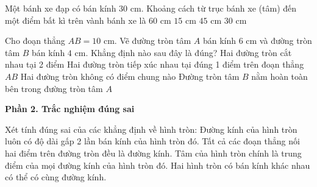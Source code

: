 \begin{ex} %
Một bánh xe đạp có bán kính $30\text{ cm}$. Khoảng cách từ trục bánh xe (tâm) đến một điểm bất kì trên vành bánh xe là
\choice
{$60\text{ cm}$}
{$15\text{ cm}$}
{$45\text{ cm}$}
{\True $30\text{ cm}$}
\end{ex}

\begin{ex} %
Cho đoạn thẳng $AB = 10\text{ cm}$. Vẽ đường tròn tâm $A$ bán kính $6\text{ cm}$ và đường tròn tâm $B$ bán kính $4\text{ cm}$. Khẳng định nào sau đây là đúng?
\choice
{Hai đường tròn cắt nhau tại 2 điểm}
{\True Hai đường tròn tiếp xúc nhau tại đúng 1 điểm trên đoạn thẳng $AB$}
{Hai đường tròn không có điểm chung nào}
{Đường tròn tâm $B$ nằm hoàn toàn bên trong đường tròn tâm $A$}
\end{ex}

\textbf{Phần 2. Trắc nghiệm đúng sai}

\begin{ex} %
Xét tính đúng sai của các khẳng định về hình tròn:
\choiceTF
{\True Đường kính của hình tròn luôn có độ dài gấp 2 lần bán kính của hình tròn đó.}
{Tất cả các đoạn thẳng nối hai điểm trên đường tròn đều là đường kính.}
{\True Tâm của hình tròn chính là trung điểm của mọi đường kính của hình tròn đó.}
{Hai hình tròn có bán kính khác nhau có thể có cùng đường kính.}
\end{ex}


